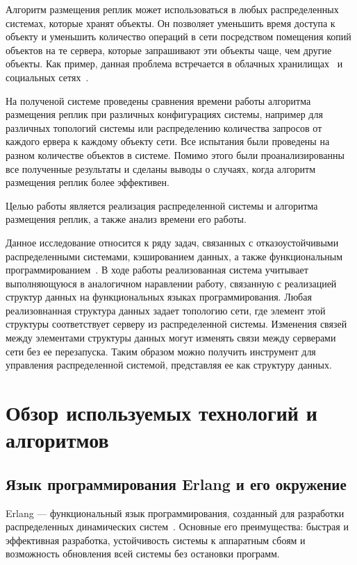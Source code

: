 	Алгоритм размещения реплик может использоваться в любых распределенных системах, которые хранят объекты. Он позволяет уменьшить время доступа к объекту и уменьшить количество операций в 
	сети посредством помещения копий объектов на те сервера, которые запрашивают эти объекты чаще, чем другие объекты. Как пример, данная проблема встречается в облачных хранилищах~\cite{cloud} 
	и социальных сетях~\cite{social}.
	
	На полученой системе проведены сравнения времени работы алгоритма размещения реплик при различных конфигурациях системы, например для различных топологий системы или распределению количества
	запросов от каждого ервера к каждому объекту сети. Все испытания были проведены на разном количестве объектов в системе. Помимо этого были проанализированны все полученные результаты 
	и сделаны выводы о случаях, когда алгоритм размещения реплик более эффективен.
	
	Целью работы является реализация распределенной системы и алгоритма размещения реплик, а также анализ времени его работы.

	Данное исследование относится к ряду задач, связанных с отказоустойчивыми распределенными системами, кэшированием данных, а также функциональным программированием~\cite{fp}. В ходе работы реализованная 
	система учитывает выполняющуюся в аналогичном наравлении работу, связанную с реализацией структур данных на функциональных языках программирования. Любая реализовнанная структура данных 
	задает топологию сети, где элемент этой структуры соответствует серверу из распределенной системы. Изменения связей между элементами структуры данных могут изменять связи между серверами 
	сети без ее перезапуска. Таким образом можно получить инструмент для управления распределенной системой, представляя ее как структуру данных.

\newpage

\chapter{Обзор используемых технологий и алгоритмов}
	\section{Язык программирования Erlang и его окружение}
		Erlang --- функциональный язык программирования, созданный для разработки распределенных динамических систем~\cite{erl}.
		Основные его преимущества: быстрая и эффективная разработка, устойчивость системы к аппаратным сбоям и 
		возможность обновления всей системы без остановки программ.

